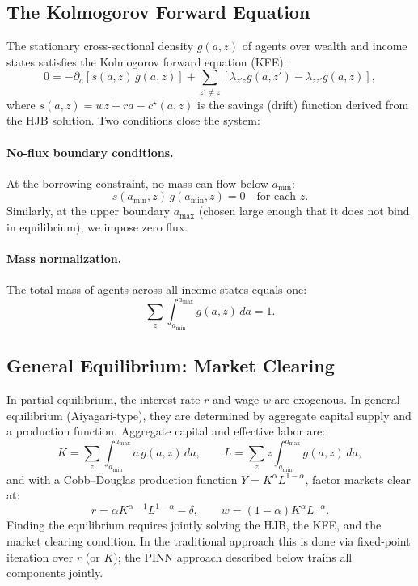 \documentclass[11pt,a4paper]{report}
\begin{document}
\subsection{The Kolmogorov Forward Equation}
\label{sec:ct_kfp}

The stationary cross-sectional density $g(a,z)$ of agents over wealth and income states satisfies the Kolmogorov forward equation (KFE):
\begin{equation}
0 = -\partial_a\!\left[s(a,z)\,g(a,z)\right]
    + \sum_{z' \neq z}\left[\lambda_{z'z}g(a,z') - \lambda_{zz'}g(a,z)\right],
\label{eq:kfp_hank}
\end{equation}
where $s(a,z) = wz + ra - c^\star(a,z)$ is the savings (drift) function derived from the HJB solution.  Two conditions close the system:

\paragraph{No-flux boundary conditions.}
At the borrowing constraint, no mass can flow below $a_{\min}$:
\begin{equation}
s(a_{\min}, z)\, g(a_{\min}, z) = 0 \quad \text{for each } z.
\label{eq:kfp_noflux}
\end{equation}
Similarly, at the upper boundary $a_{\max}$ (chosen large enough that it does not bind in equilibrium), we impose zero flux.

\paragraph{Mass normalization.}
The total mass of agents across all income states equals one:
\begin{equation}
\sum_{z}\int_{a_{\min}}^{a_{\max}} g(a,z)\,da = 1.
\label{eq:kfp_mass}
\end{equation}

\subsection{General Equilibrium: Market Clearing}
\label{sec:ct_ge}

In partial equilibrium, the interest rate $r$ and wage $w$ are exogenous.  In general equilibrium (Aiyagari-type), they are determined by aggregate capital supply and a production function.  Aggregate capital and effective labor are:
\begin{equation}
K = \sum_z \int_{a_{\min}}^{a_{\max}} a\, g(a,z)\, da,
\qquad
L = \sum_z z\int_{a_{\min}}^{a_{\max}} g(a,z)\, da,
\end{equation}
and with a Cobb--Douglas production function $Y = K^\alpha L^{1-\alpha}$, factor markets clear at:
\begin{equation}
r = \alpha K^{\alpha-1}L^{1-\alpha} - \delta, \qquad w = (1-\alpha)K^\alpha L^{-\alpha}.
\label{eq:ct_prices}
\end{equation}
Finding the equilibrium requires jointly solving the HJB, the KFE, and the market clearing condition.  In the traditional approach this is done via fixed-point iteration over $r$ (or $K$); the PINN approach described below trains all components jointly.
\end{document}

